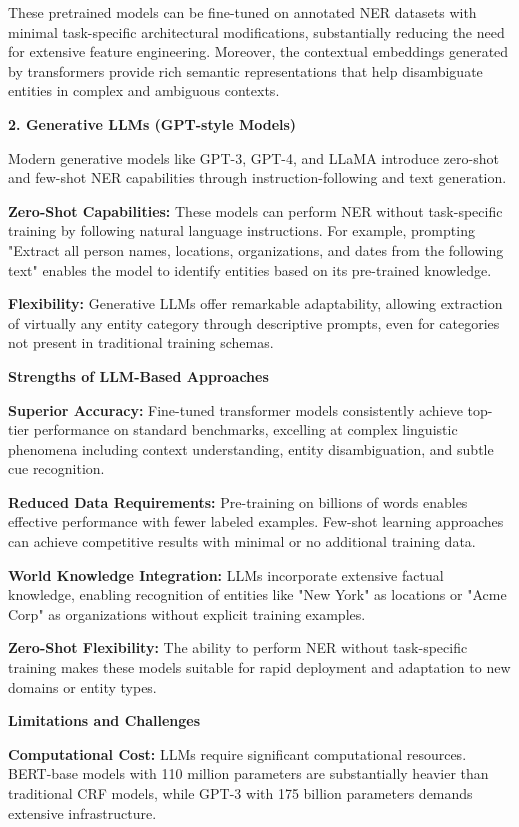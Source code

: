 \documentclass[12pt,a4paper]{article}
\begin{document}
These pretrained models can be fine-tuned on annotated NER datasets with minimal task-specific architectural modifications, substantially reducing the need for extensive feature engineering. Moreover, the contextual embeddings generated by transformers provide rich semantic representations that help disambiguate entities in complex and ambiguous contexts.

\textbf{2. Generative LLMs (GPT-style Models)}

Modern generative models like GPT-3, GPT-4, and LLaMA introduce zero-shot and few-shot NER capabilities through instruction-following and text generation.

\textbf{Zero-Shot Capabilities:} These models can perform NER without task-specific training by following natural language instructions. For example, prompting "Extract all person names, locations, organizations, and dates from the following text" enables the model to identify entities based on its pre-trained knowledge.

\textbf{Flexibility:} Generative LLMs offer remarkable adaptability, allowing extraction of virtually any entity category through descriptive prompts, even for categories not present in traditional training schemas.

\textbf{Strengths of LLM-Based Approaches}

\textbf{Superior Accuracy:} Fine-tuned transformer models consistently achieve top-tier performance on standard benchmarks, excelling at complex linguistic phenomena including context understanding, entity disambiguation, and subtle cue recognition.

\textbf{Reduced Data Requirements:} Pre-training on billions of words enables effective performance with fewer labeled examples. Few-shot learning approaches can achieve competitive results with minimal or no additional training data.

\textbf{World Knowledge Integration:} LLMs incorporate extensive factual knowledge, enabling recognition of entities like "New York" as locations or "Acme Corp" as organizations without explicit training examples.

\textbf{Zero-Shot Flexibility:} The ability to perform NER without task-specific training makes these models suitable for rapid deployment and adaptation to new domains or entity types.

\textbf{Limitations and Challenges}

\textbf{Computational Cost:} LLMs require significant computational resources. BERT-base models with 110 million parameters are substantially heavier than traditional CRF models, while GPT-3 with 175 billion parameters demands extensive infrastructure.
\end{document}
